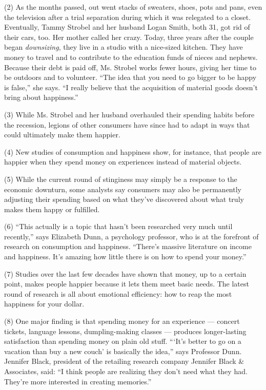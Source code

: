 \documentclass[UTF8,11pt]{ctexart}
\begin{document}
(2) As the months passed, out went stacks of sweaters, shoes, pots and pans, even the television after a trial separation during which it was relegated to a closet. Eventually, Tammy Strobel and her husband Logan Smith, both 31, got rid of their cars, too. Her mother called her crazy. Today, three years after the couple began \textit{downsizing}, they live in a studio with a nice-sized kitchen. They have money to travel and to contribute to the education funds of nieces and nephews. Because their debt is paid off, Ms. Strobel works fewer hours, giving her time to be outdoors and to volunteer. “The idea that you need to go bigger to be happy is false,” she says. “I really believe that the acquisition of material goods doesn’t bring about happiness.”


(3) While Ms. Strobel and her husband overhauled their spending habits before the recession, legions of other consumers have since had to adapt in ways that could ultimately make them happier.


(4) New studies of consumption and happiness show, for instance, that people are happier when they spend money on experiences instead of material objects.


(5) While the current round of stinginess may simply be a response to the economic downturn, some analysts say consumers may also be permanently adjusting their spending based on what they’ve discovered about what truly makes them happy or fulfilled.


(6) “This actually is a topic that hasn’t been researched very much until recently,” says Elizabeth Dunn, a psychology professor, who is at the forefront of research on consumption and happiness. “There’s massive literature on income and happiness. It’s amazing how little there is on how to spend your money.”


(7) Studies over the last few decades have shown that money, up to a certain point, makes people happier because it lets them meet basic needs. The latest round of research is all about emotional efficiency: how to reap the most happiness for your dollar.


(8) One major finding is that spending money for an experience — concert tickets, language lessons, dumpling-making classes — produces longer-lasting satisfaction than spending money on plain old stuff. “‘It’s better to go on a vacation than buy a new couch’ is basically the idea,” says Professor Dunn. Jennifer Black, president of the retailing research company Jennifer Black \& Associates, said: “I think people are realizing they don’t need what they had. They’re more interested in creating memories.”
\end{document}
